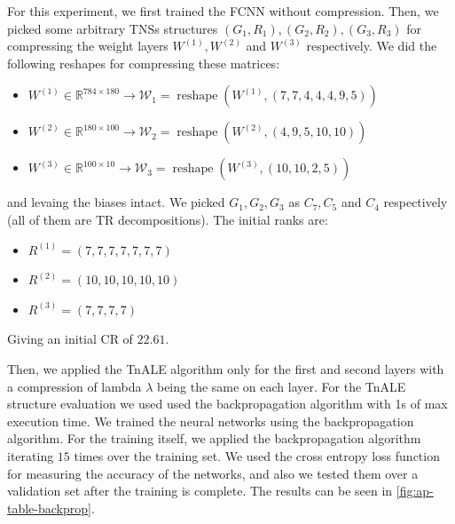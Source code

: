 \documentclass[11pt,a4paper,openright,oneside]{book}
\numberwithin{equation}{section}
\newcommand{\figref}[1]{\cref{#1}}
\DeclareMathOperator{\reshape}{reshape}
\begin{document}
{For this experiment, we first trained the FCNN without compression. Then, we picked some arbitrary
TNSs structures $(G_1, R_1), (G_2, R_2), (G_3, R_3)$ for compressing the weight layers $W^{(1)}, W^{(2)}$ and $W^{(3)}$
respectively. We did the following reshapes for compressing these matrices:
\begin{itemize}
    \item $W^{(1)} \in \mathbb{R}^{784 \times 180} \rightarrow \mathcal{W}_1 = \reshape(W^{(1)}, (7,7,4,4,4,9,5))$
    \item $W^{(2)} \in \mathbb{R}^{180 \times 100} \rightarrow \mathcal{W}_2 = \reshape(W^{(2)}, (4,9,5,10,10))$
    \item $W^{(3)} \in \mathbb{R}^{100 \times 10} \rightarrow \mathcal{W}_3 = \reshape(W^{(3)}, (10,10,2,5))$
\end{itemize}

and levaing the biases intact. We picked $G_1, G_2, G_3$ as $C_7, C_5$ and $C_4$ respectively (all of them are \gls{TR} decompositions). The initial ranks
are:

\begin{itemize}
    \item $R^{(1)} = (7,7,7,7,7,7,7)$
    \item $R^{(2)} = (10,10,10,10,10)$
    \item $R^{(3)} = (7,7,7,7)$
\end{itemize}
Giving an initial \gls{CR} of $22.61$.

Then, we applied the \gls{TnALE} algorithm only for the first and second layers with a compression of lambda $\lambda$ being the same on each layer. For the
\gls{TnALE} structure evaluation we used used the backpropagation algorithm with 1s of max execution time. 
We trained the neural networks using the backpropagation algorithm. For the training itself,
we applied the backpropagation algorithm iterating $15$ times
over the training set. We used the cross entropy loss function for measuring the accuracy of the networks, and also
we tested them over a validation set after the training is complete. The results can be seen in \figref{fig:ap-table-backprop}.

}
\end{document}
